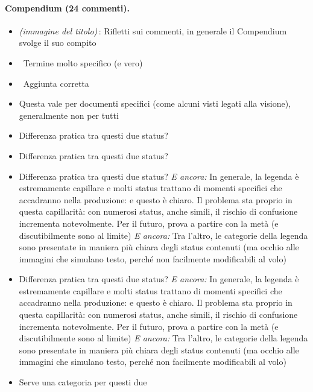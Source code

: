 \paragraph{Compendium (24 commenti).}
{\small
\begin{itemize}
  \item \emph{(immagine del titolo)}\,: Rifletti sui commenti, in generale il Compendium svolge il suo compito
  \item {} \rvBene\ Termine molto specifico (e vero)
  \item {} \rvBene\ Aggiunta corretta
  \item {} Questa vale per documenti specifici (come alcuni visti legati alla visione), generalmente non per tutti
  \item {} Differenza pratica tra questi due status?
  \item {} Differenza pratica tra questi due status?
  \item {} Differenza pratica tra questi due status? \emph{E ancora:} In generale, la legenda è estremamente capillare e molti status trattano di momenti specifici che accadranno nella produzione: e questo è chiaro. Il problema sta proprio in questa capillarità: con numerosi status, anche simili, il rischio di confusione incrementa notevolmente. Per il futuro, prova a partire con la metà (e discutibilmente sono al limite) \emph{E ancora:} Tra l'altro, le categorie della legenda sono presentate in maniera più chiara degli status contenuti (ma occhio alle immagini che simulano testo, perché non facilmente modificabili al volo)
  \item {} Differenza pratica tra questi due status? \emph{E ancora:} In generale, la legenda è estremamente capillare e molti status trattano di momenti specifici che accadranno nella produzione: e questo è chiaro. Il problema sta proprio in questa capillarità: con numerosi status, anche simili, il rischio di confusione incrementa notevolmente. Per il futuro, prova a partire con la metà (e discutibilmente sono al limite) \emph{E ancora:} Tra l'altro, le categorie della legenda sono presentate in maniera più chiara degli status contenuti (ma occhio alle immagini che simulano testo, perché non facilmente modificabili al volo)
  \item {} Serve una categoria per questi due

\end{itemize}}
